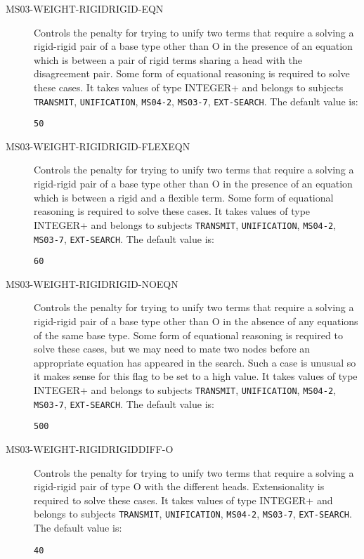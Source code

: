 \begin{description}
\item[MS03-WEIGHT-RIGIDRIGID-EQN]  
Controls the penalty for trying to unify two terms that require a
solving a rigid-rigid pair of a base type other than O in the presence
of an equation which is between a pair of rigid terms sharing a head
with the disagreement pair.  Some form of equational reasoning is
required to solve these cases.
It takes values of type INTEGER+ and belongs to subjects \texttt{TRANSMIT}, \texttt{UNIFICATION}, \texttt{MS04-2}, \texttt{MS03-7}, \texttt{EXT-SEARCH}.  The default value is: \begin{lstlisting}
50
\end{lstlisting}

\item[MS03-WEIGHT-RIGIDRIGID-FLEXEQN]  
Controls the penalty for trying to unify two terms that require a
solving a rigid-rigid pair of a base type other than O in the presence
of an equation which is between a rigid and a flexible term.  Some
form of equational reasoning is required to solve these cases.
It takes values of type INTEGER+ and belongs to subjects \texttt{TRANSMIT}, \texttt{UNIFICATION}, \texttt{MS04-2}, \texttt{MS03-7}, \texttt{EXT-SEARCH}.  The default value is: \begin{lstlisting}
60
\end{lstlisting}

\item[MS03-WEIGHT-RIGIDRIGID-NOEQN]  
Controls the penalty for trying to unify two terms that require a
solving a rigid-rigid pair of a base type other than O in the absence
of any equations of the same base type.  Some form of equational
reasoning is required to solve these cases, but we may need to mate
two nodes before an appropriate equation has appeared in the search.
Such a case is unusual so it makes sense for this flag to be set to a
high value.
It takes values of type INTEGER+ and belongs to subjects \texttt{TRANSMIT}, \texttt{UNIFICATION}, \texttt{MS04-2}, \texttt{MS03-7}, \texttt{EXT-SEARCH}.  The default value is: \begin{lstlisting}
500
\end{lstlisting}

\item[MS03-WEIGHT-RIGIDRIGIDDIFF-O]  
Controls the penalty for trying to unify two terms that require a
solving a rigid-rigid pair of type O with the different heads.
Extensionality is required to solve these cases.
It takes values of type INTEGER+ and belongs to subjects \texttt{TRANSMIT}, \texttt{UNIFICATION}, \texttt{MS04-2}, \texttt{MS03-7}, \texttt{EXT-SEARCH}.  The default value is: \begin{lstlisting}
40
\end{lstlisting}


\end{description}
